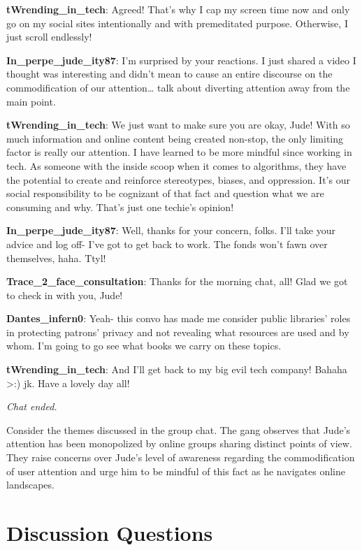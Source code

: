 \documentclass[
  letterpaper,
  DIV=11,
  numbers=noendperiod]{scrreprt}
\begin{document}
\textbf{tWrending\_in\_tech}: Agreed! That's why I cap my screen time
now and only go on my social sites intentionally and with premeditated
purpose. Otherwise, I just scroll endlessly!

\textbf{In\_perpe\_jude\_ity87}: I'm surprised by your reactions. I just
shared a video I thought was interesting and didn't mean to cause an
entire discourse on the commodification of our attention\ldots{} talk
about diverting attention away from the main point.

\textbf{tWrending\_in\_tech}: We just want to make sure you are okay,
Jude! With so much information and online content being created
non-stop, the only limiting factor is really our attention. I have
learned to be more mindful since working in tech. As someone with the
inside scoop when it comes to algorithms, they have the potential to
create and reinforce stereotypes, biases, and oppression. It's our
social responsibility to be cognizant of that fact and question what we
are consuming and why. That's just one techie's opinion!

\textbf{In\_perpe\_jude\_ity87}: Well, thanks for your concern, folks.
I'll take your advice and log off- I've got to get back to work. The
fonds won't fawn over themselves, haha. Ttyl!

\textbf{Trace\_2\_face\_consultation}: Thanks for the morning chat, all!
Glad we got to check in with you, Jude!

\textbf{Dantes\_infern0}: Yeah- this convo has made me consider public
libraries' roles in protecting patrons' privacy and not revealing what
resources are used and by whom. I'm going to go see what books we carry
on these topics.

\textbf{tWrending\_in\_tech}: And I'll get back to my big evil tech
company! Bahaha \textgreater:) jk. Have a lovely day all!

\emph{Chat ended.}

Consider the themes discussed in the group chat. The gang observes that
Jude's attention has been monopolized by online groups sharing distinct
points of view. They raise concerns over Jude's level of awareness
regarding the commodification of user attention and urge him to be
mindful of this fact as he navigates online landscapes.

\section{Discussion Questions}\label{discussion-questions-4}
\end{document}
